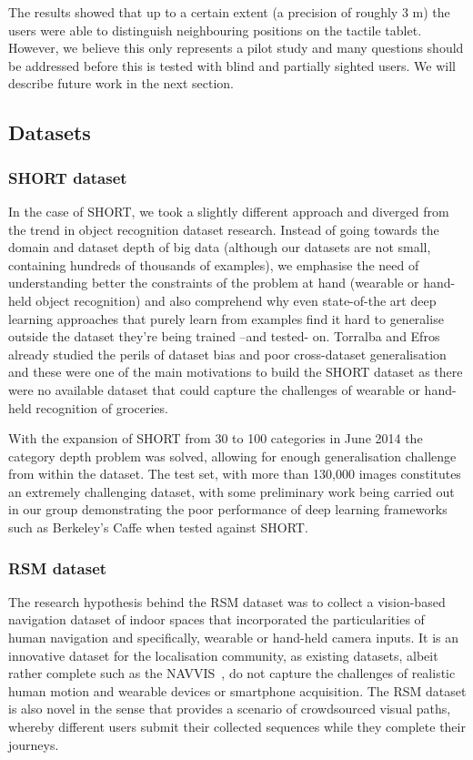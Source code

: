 The results showed that up to a certain extent (a precision of roughly 3 m) the users were able to distinguish neighbouring positions on the tactile tablet. However, we believe this only represents a pilot study and many questions should be addressed before this is tested with blind and partially sighted users. We will describe future work in the next section.

\subsection{Datasets}

\subsubsection{SHORT dataset}

In the case of SHORT, we took a slightly different approach and diverged from the trend in object recognition dataset research. Instead of going towards the domain and dataset depth of big data (although our datasets are not small, containing hundreds of thousands of examples), we emphasise the need of understanding better the constraints of the problem at hand (wearable or hand-held object recognition) and also comprehend why even state-of-the art deep learning approaches that purely learn from examples find it hard to generalise outside the dataset they're being trained --and tested- on. Torralba and Efros already studied the perils of dataset bias and poor cross-dataset generalisation \cite{torralba2011unbiased} and these were one of the main motivations to build the SHORT dataset as there were no available dataset that could capture the challenges of wearable or hand-held recognition of groceries.

With the expansion of SHORT from 30 to 100 categories in June 2014 the category depth problem was solved, allowing for enough generalisation challenge from within the dataset. The test set, with more than	 130,000 images constitutes an extremely challenging dataset, with some preliminary work  being carried out in our group demonstrating the poor performance of deep learning frameworks such as Berkeley's Caffe \cite{jia2014caffe} when tested against SHORT.

\subsubsection{RSM dataset}

The research hypothesis behind the RSM dataset was to collect a vision-based navigation dataset of indoor spaces that incorporated the particularities of human navigation and specifically, wearable or hand-held camera inputs. It is an innovative dataset for the localisation community, as existing datasets, albeit rather complete such as the NAVVIS~\cite{Huitl2012}, do not capture the challenges of realistic human motion and wearable devices or smartphone acquisition. The RSM dataset is also novel in the sense that provides a scenario of crowdsourced visual paths, whereby   different users submit their collected sequences while they complete their journeys. 

